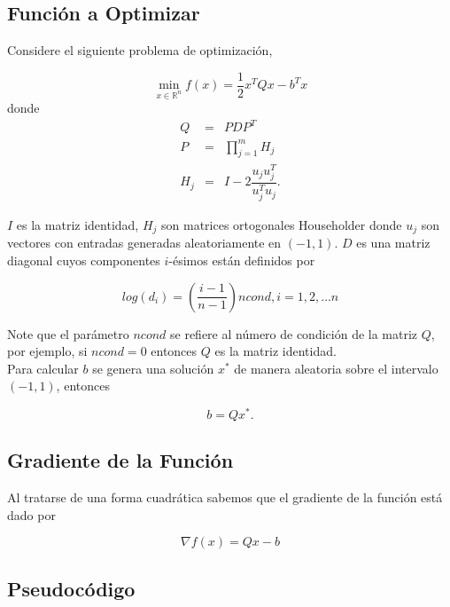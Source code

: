 \documentclass[11pt,letterpaper]{article}
\theoremstyle{definition}
\theoremstyle{definition}
\theoremstyle{definition}
\begin{document}
\subsection{Función a Optimizar}
Considere el siguiente problema de optimización,
\begin{shaded*}
	\begin{equation*}
	\min_{x\in\mathbb{R}^n} f(x) = \dfrac{1}{2} x^T Q x - b^T x
	\end{equation*}
	donde
	\begin{eqnarray}
		Q   & = & P D P^T \\
		P   & = & \prod_{j = 1}^{m} H_j \\
		H_j & = & I - 2 \dfrac{u_j u_j^T}{u_j^T u_j}.
	\end{eqnarray}
\end{shaded*}
$ I $ es la matriz identidad, $ H_j $ son matrices ortogonales Householder donde $ u_j $ son vectores con entradas generadas aleatoriamente en $ (-1, 1) $. $ D $ es una matriz diagonal cuyos componentes $ i $-ésimos están definidos por
\begin{shaded*}
	\begin{equation*}
		log(d_i) = \left( \dfrac{i - 1}{n-1} \right) ncond, i = 1, 2, \dots n
	\end{equation*}
\end{shaded*}
Note que el parámetro $ ncond $ se refiere al número de condición de la matriz $ Q $, por ejemplo, si $ ncond = 0 $ entonces $ Q $ es la matriz identidad.
\\
Para calcular $ b $ se genera una solución $ x^* $ de manera aleatoria sobre el intervalo $ (-1,1) $, entonces
\begin{shaded*}
	\begin{equation*}
		b = Q x^*.
	\end{equation*}
\end{shaded*}

\subsection{Gradiente de la Función}
Al tratarse de una forma cuadrática sabemos que el gradiente de la función está dado por
\begin{shaded*}
	\begin{equation*}
		\nabla f(x) = Qx - b
	\end{equation*}
\end{shaded*}

\subsection{Pseudocódigo}
\end{document}
